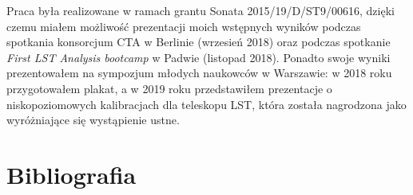 \documentclass[a4paper,11pt,twoside]{article}
\begin{document}
Praca była realizowane w ramach grantu Sonata 2015/19/D/ST9/00616, dzięki czemu miałem możliwość prezentacji moich wstępnych wyników podczas spotkania konsorcjum CTA w Berlinie (wrzesień 2018) oraz podczas spotkanie \textsl{First LST Analysis bootcamp} w Padwie (listopad 2018). Ponadto swoje wyniki prezentowałem na sympozjum młodych naukowców w Warszawie: w 2018 roku przygotowałem plakat, a w 2019 roku przedstawiłem prezentacje o niskopoziomowych kalibracjach dla teleskopu LST, która została nagrodzona jako wyróżniające się wystąpienie ustne. 

\newpage
\section{Bibliografia}
\begingroup
\renewcommand{\section}[2]{}%
\end{document}

